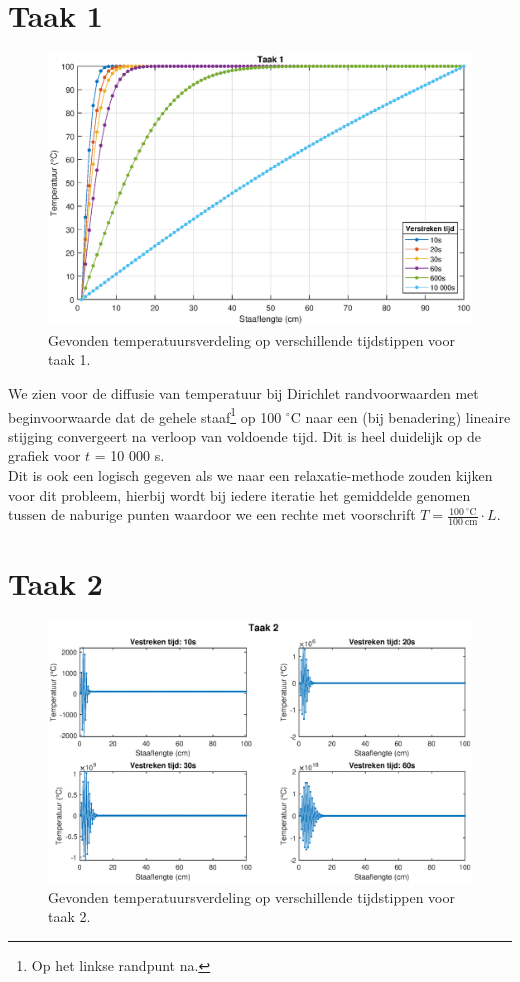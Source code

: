 \documentclass[a4paper,11pt]{article}
\begin{document}
\newpage
\section*{Taak 1}
  \FloatBarrier
  \begin{figure}[ht!]
    \includegraphics[width = \textwidth]{taak1.eps}
    \caption{Gevonden temperatuursverdeling op verschillende tijdstippen voor taak 1.}
    \label{taak1}
  \end{figure}
  \FloatBarrier

  \noindent
  We zien voor de diffusie van temperatuur bij Dirichlet randvoorwaarden met beginvoorwaarde dat de gehele staaf\footnote{Op het linkse randpunt na.} op 100 $^\circ$C naar een (bij benadering) lineaire stijging convergeert na verloop van voldoende tijd. Dit is heel duidelijk op de grafiek voor $t$ = 10 000 s.\\

  \noindent
  Dit is ook een logisch gegeven als we naar een relaxatie-methode zouden kijken voor dit probleem, hierbij wordt bij iedere iteratie het gemiddelde genomen tussen de naburige punten waardoor we een rechte met voorschrift $T = \frac{100\ ^\circ\mathrm{C}}{100 \ \mathrm{cm}}\cdot L$.

\newpage
\section*{Taak 2}
  \FloatBarrier
  \begin{figure}[ht!]
    \includegraphics[width = \textwidth]{taak2.eps}
    \caption{Gevonden temperatuursverdeling op verschillende tijdstippen voor taak 2.}
    \label{taak2}
  \end{figure}
  \FloatBarrier
\end{document}
